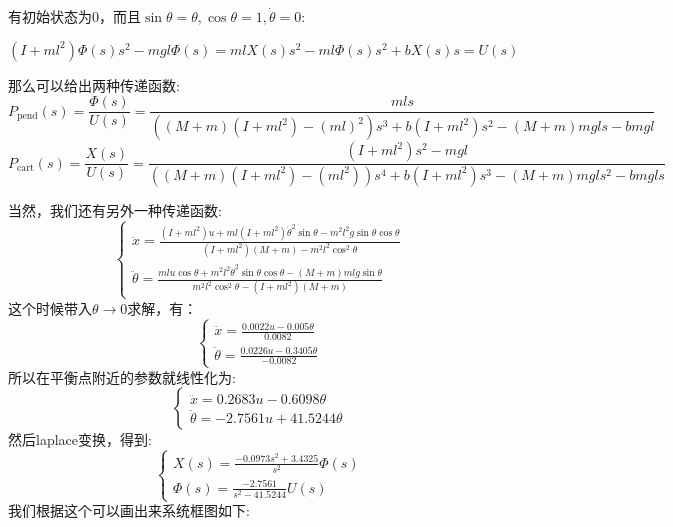 \documentclass{article}
\begin{document}
有初始状态为0，而且$\sin\theta=\theta,\cos\theta=1,\dot{\theta}=0$:

\[
(I+ml^2)\Phi(s)s^2-mgl\Phi(s)=mlX(s)s^2-ml\Phi(s)s^2+bX(s)s=U(s)
\]

那么可以给出两种传递函数:
\[
P_\text{pend}(s)=\frac{\Phi(s)}{U(s)}=\frac{mls}{((M+m)(I+ml^2)-(ml)^2)s^3+b(I+ml^2)s^2-(M+m)mgls-bmgl}
\]
\[
P_\text{cart}(s)=\frac{X(s)}{U(s)}=\frac{(I+ml^2)s^2-mgl}{((M+m)(I+ml^2)-(ml^2))s^4+b(I+ml^2)s^3-(M+m)mgls^2-bmgls}
\]

当然，我们还有另外一种传递函数:
\[
\left\{
    \begin{matrix}
    \ddot{x}=\frac{(I+ml^2)u+ml(I+ml^2)\dot{\theta}^2\sin\theta-m^2l^2g\sin\theta\cos\theta}{(I+ml^2)(M+m)-m^2l^2\cos^2\theta}\\
    \ddot{\theta}=\frac{mlu\cos\theta+m^2l^2\dot{\theta}^2\sin\theta\cos\theta-(M+m)mlg\sin\theta}{m^2l^2\cos^2\theta-(I+ml^2)(M+m)}
    \end{matrix}
\right.
\]
这个时候带入$\theta\to 0$求解，有：
\[
\left\{
    \begin{matrix}
    \ddot{x}=\frac{0.0022u-0.005\theta}{0.0082}\\
    \ddot{\theta}=\frac{0.0226u-0.3405\theta}{-0.0082}
    \end{matrix}
\right.
\]
所以在平衡点附近的参数就线性化为:
\[
\left\{
    \begin{matrix}
    \ddot{x}=0.2683u-0.6098\theta\\
    \ddot{\theta}=-2.7561u+41.5244\theta
    \end{matrix}
\right.
\]
然后laplace变换，得到:
\[
\left\{
    \begin{matrix}
    X(s)=\frac{-0.0973s^2+3.4325}{s^2}\Phi(s)\\
    \Phi(s)=\frac{-2.7561}{s^2-41.5244}U(s)
    \end{matrix}
\right.
\]
我们根据这个可以画出来系统框图如下:
\begin{center}
\end{center}
\end{document}
